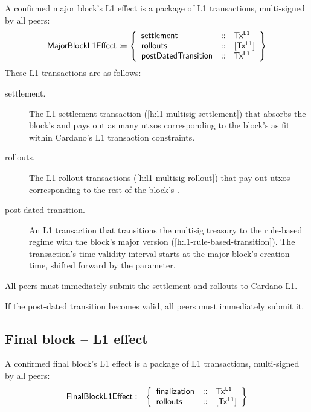 \documentclass[../hydrozoa.tex]{subfiles}
\begin{document}
A confirmed major block's L1 effect is a package of L1 transactions, multi-signed by all peers:
\begin{equation*}
  \mathsf{MajorBlockL1Effect} \coloneq \left\{
  \begin{array}{lll}
    \mathsf{settlement} &::& \mathsf{Tx^{L1}} \\
    \mathsf{rollouts} &::& [\mathsf{Tx^{L1}}] \\
    \mathsf{postDatedTransition} &::& \mathsf{Tx^{L1}}
  \end{array}\right\}
\end{equation*}
These L1 transactions are as follows:
\begin{description}
  \item[settlement.] The L1 settlement transaction (\cref{h:l1-multisig-settlement}) that absorbs the block's  and pays out as many utxos corresponding to the block's  as fit within Cardano's L1 transaction constraints.
  \item[rollouts.] The L1 rollout transactions (\cref{h:l1-multisig-rollout}) that pay out utxos corresponding to the rest of the block's .
  \item[post-dated transition.] An L1 transaction that transitions the multisig treasury to the rule-based regime with the block's major version (\cref{h:l1-rule-based-transition}).
    The transaction's time-validity interval starts at the major block's creation time, shifted forward by the  parameter.
\end{description}

All peers must immediately submit the settlement and rollouts to Cardano L1.

If the post-dated transition becomes valid, all peers must immediately submit it.

\subsection{Final block -- L1 effect}%
\label{h:l2-block-effect-final-block}%

A confirmed final block's L1 effect is a package of L1 transactions, multi-signed by all peers:
\begin{equation*}
  \mathsf{FinalBlockL1Effect} \coloneq \left\{
  \begin{array}{lll}
    \mathsf{finalization} &::& \mathsf{Tx^{L1}} \\
    \mathsf{rollouts} &::& [\mathsf{Tx^{L1}}] \\
  \end{array}\right\}
\end{equation*}
\end{document}
